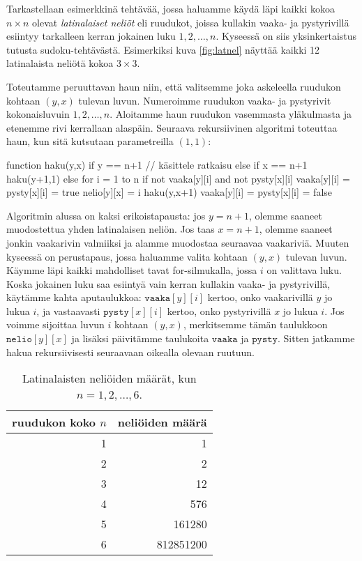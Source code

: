 Tarkastellaan esimerkkinä tehtävää, jossa haluamme käydä läpi
kaikki kokoa $n \times n$ olevat \emph{latinalaiset neliöt}
eli ruudukot, joissa kullakin vaaka- ja pystyrivillä
esiintyy tarkalleen kerran jokainen luku $1,2,\dots,n$.
Kyseessä on siis yksinkertaistus tutusta sudoku-tehtävästä.
Esimerkiksi kuva \ref{fig:latnel} näyttää kaikki 12 latinalaista neliötä kokoa $3 \times 3$.

Toteutamme peruuttavan haun niin, että valitsemme joka askeleella
ruudukon kohtaan $(y,x)$ tulevan luvun.
Numeroimme ruudukon vaaka- ja pystyrivit kokonaisluvuin $1,2,\dots,n$.
Aloitamme haun ruudukon vasemmasta yläkul\-masta ja etenemme
rivi kerrallaan alaspäin.
Seuraava rekursiivinen algoritmi toteuttaa haun,
kun sitä kutsutaan parametreilla $(1,1)$:

\begin{code}
function haku(y,x)
    if y == n+1
        // käsittele ratkaisu
    else if x == n+1
        haku(y+1,1)
    else
        for i = 1 to n
            if not vaaka[y][i] and not pysty[x][i]
                vaaka[y][i] = pysty[x][i] = true
                nelio[y][x] = i
                haku(y,x+1)
                vaaka[y][i] = pysty[x][i] = false
\end{code}

Algoritmin alussa on kaksi erikoistapausta:
jos $y=n+1$, olemme saaneet muodostettua
yhden latinalaisen neliön.
Jos taas $x=n+1$, olemme saaneet jonkin vaakarivin
valmiiksi ja alamme muodostaa seuraavaa vaakariviä.
Muuten kyseessä on perustapaus, jossa haluamme
valita kohtaan $(y,x)$ tulevan luvun.
Käymme läpi kaikki mahdolliset tavat for-silmukalla,
jossa $i$ on valittava luku.
Koska jokainen luku saa esiintyä vain kerran kullakin
vaaka- ja pystyrivillä, käytämme kahta aputaulukkoa:
$\texttt{vaaka}[y][i]$ kertoo, onko vaakarivillä $y$
jo lukua $i$, ja vastaavasti $\texttt{pysty}[x][i]$ kertoo,
onko pystyrivillä $x$ jo lukua $i$.
Jos voimme sijoittaa luvun $i$ kohtaan $(y,x)$,
merkitsemme tämän taulukkoon $\texttt{nelio}[y][x]$
ja lisäksi päivitämme taulukoita $\texttt{vaaka}$ ja $\texttt{pysty}$.
Sitten jatkamme hakua rekursiivisesti seuraavaan
oikealla olevaan ruutuun.

\begin{table}
\center
\begin{tabular}{rr}
ruudukon koko $n$ & neliöiden määrä \\
\hline
1 & 1 \\
2 & 2 \\
3 & 12 \\
4 & 576 \\
5 & 161280 \\
6 & 812851200 \\
\end{tabular}
\caption{Latinalaisten neliöiden määrät, kun $n=1,2,\dots,6$.}
\label{tab:latnel}
\end{table}

